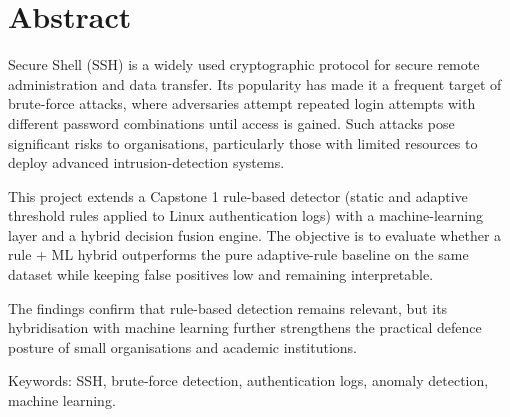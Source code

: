 \chapter*{Abstract}

Secure Shell (SSH) is a widely used cryptographic protocol for secure remote
administration and data transfer. Its popularity has made it a frequent target
of brute-force attacks, where adversaries attempt repeated login attempts with
different password combinations until access is gained. Such attacks pose
significant risks to organisations, particularly those with limited resources
to deploy advanced intrusion-detection systems.

This project extends a Capstone 1 rule-based detector (static and adaptive
threshold rules applied to Linux authentication logs) with a machine-learning
layer and a hybrid decision fusion engine. The objective is to evaluate
whether a rule + ML hybrid outperforms the pure adaptive-rule baseline on the
same dataset while keeping false positives low and remaining interpretable.



The findings confirm that rule-based detection remains relevant, but its
hybridisation with machine learning further strengthens the practical
defence posture of small organisations and academic institutions.

Keywords: SSH, brute-force detection, authentication logs, anomaly
detection, machine learning.
